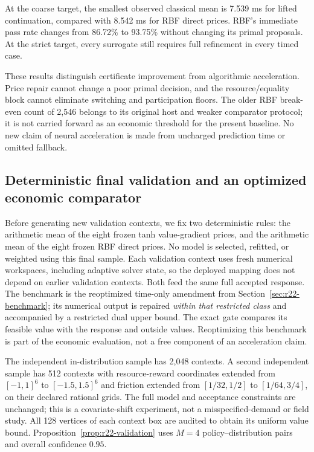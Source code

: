 \documentclass[11pt,letterpaper]{article}
\theoremstyle{definition}
\newcommand{\1}{\mathbf 1}
\begin{document}


At the coarse target, the smallest observed classical mean is 7.539 ms for lifted continuation, compared with 8.542 ms for RBF direct prices. RBF's immediate pass rate changes from 86.72\% to 93.75\% without changing its primal proposals. At the strict target, every surrogate still requires full refinement in every timed case.


These results distinguish certificate improvement from algorithmic acceleration. Price repair cannot change a poor primal decision, and the resource/equality block cannot eliminate switching and participation floors. The older RBF break-even count of 2,546 belongs to its original host and weaker comparator protocol; it is not carried forward as an economic threshold for the present baseline. No new claim of neural acceleration is made from uncharged prediction time or omitted fallback.

\subsection{Deterministic final validation and an optimized economic comparator}
Before generating new validation contexts, we fix two deterministic rules: the arithmetic mean of the eight frozen tanh value-gradient prices, and the arithmetic mean of the eight frozen RBF direct prices. No model is selected, refitted, or weighted using this final sample. Each validation context uses fresh numerical workspaces, including adaptive solver state, so the deployed mapping does not depend on earlier validation contexts. Both feed the same full accepted response. The benchmark is the reoptimized time-only amendment from Section~\ref{sec:r22-benchmark}; its numerical output is repaired \emph{within that restricted class} and accompanied by a restricted dual upper bound. The exact gate compares its feasible value with the response and outside values. Reoptimizing this benchmark is part of the economic evaluation, not a free component of an acceleration claim.

The independent in-distribution sample has 2,048 contexts. A second independent sample has 512 contexts with resource-reward coordinates extended from $[-1,1]^6$ to $[-1.5,1.5]^6$ and friction extended from $[1/32,1/2]$ to $[1/64,3/4]$, on their declared rational grids. The full model and acceptance constraints are unchanged; this is a covariate-shift experiment, not a misspecified-demand or field study. All 128 vertices of each context box are audited to obtain its uniform value bound. Proposition~\ref{prop:r22-validation} uses $M=4$ policy--distribution pairs and overall confidence $0.95$.
\end{document}
